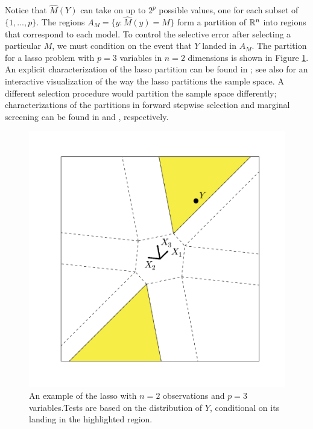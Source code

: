 \documentclass{article}
\theoremstyle{definition}
\newcommand{\hM}{\widehat{M}}
\begin{document}
Notice that $\hM(Y)$ can take on up to $2^p$ possible values, one for each subset of $\{1, ..., p\}$. The regions $A_M = \{y: \hM(y) = M\}$ form a partition of $\mathbb{R}^n$ into regions that correspond to each model. To control the selective error after selecting a particular $M$, we must condition on the event that $Y$ landed in $A_M$. The partition for a lasso problem with $p=3$ variables in $n=2$ dimensions is shown in Figure \ref{fig:lasso_partition}. An explicit characterization of the lasso partition can be found in \citet{lee2016exact}; see also \citet{harris2014visualizing} for an interactive visualization of the way the lasso partitions the sample space. A different selection procedure would partition the sample space differently; characterizations of the partitions in forward stepwise selection and marginal screening can be found in \citet{loftus2014significance} and \citet{lee2014marginal}, respectively.

\begin{figure}
\begin{center}
\includegraphics[trim = 23mm 23mm 23mm 23mm, clip=TRUE, width=.4\textwidth]{figs/fig_lasso1.png}
\end{center}
\caption{An example of the lasso with $n=2$ observations and $p=3$ variables.Tests are based on the distribution of $Y$, conditional on its landing in the highlighted region.}
\label{fig:lasso_partition}
\end{figure}
\end{document}
